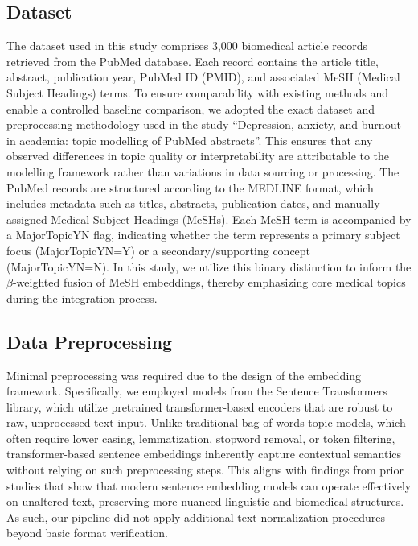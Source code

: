 \documentclass[authorproof,JACIII,researchpaper]{fujipressarticle}
\begin{document}
\subsection{Dataset}
The dataset used in this study comprises 3,000 biomedical article records retrieved from the PubMed database. Each record contains the article title, abstract, publication year, PubMed ID (PMID), and associated MeSH (Medical Subject Headings) terms. To ensure comparability with existing methods and enable a controlled baseline comparison, we adopted the exact dataset and preprocessing methodology used in the study ``Depression, anxiety, and burnout in academia: topic modelling of PubMed abstracts''\cite{ma_ai-powered_2025}. This ensures that any observed differences in topic quality or interpretability are attributable to the modelling framework rather than variations in data sourcing or processing.
The PubMed records are structured according to the MEDLINE format, which includes metadata such as titles, abstracts, publication dates, and manually assigned Medical Subject Headings (MeSHs). Each MeSH term is accompanied by a MajorTopicYN flag, indicating whether the term represents a primary subject focus (MajorTopicYN=Y) or a secondary/supporting concept (MajorTopicYN=N). In this study, we utilize this binary distinction to inform the $\beta$-weighted fusion of MeSH embeddings, thereby emphasizing core medical topics during the integration process.

\subsection{Data Preprocessing}
Minimal preprocessing was required due to the design of the embedding framework. Specifically, we employed models from the Sentence Transformers library, which utilize pretrained transformer-based encoders that are robust to raw, unprocessed text input\cite{reimers_sentence-bert_2019}. Unlike traditional bag-of-words topic models, which often require lower casing, lemmatization, stopword removal, or token filtering, transformer-based sentence embeddings inherently capture contextual semantics without relying on such preprocessing steps. This aligns with findings from prior studies that show that modern sentence embedding models can operate effectively on unaltered text, preserving more nuanced linguistic and biomedical structures\cite{wang_graph-embedded_2022}. As such, our pipeline did not apply additional text normalization procedures beyond basic format verification.
\end{document}
